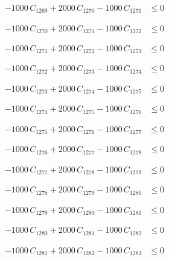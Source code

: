 \documentclass[a4paper,11pt]{article}
\begin{document}
\begin{align}
-1000\,C_{1269} + 2000\,C_{1270} - 1000\,C_{1271} &\leq 0 \nonumber
\end{align}

\begin{align}
-1000\,C_{1270} + 2000\,C_{1271} - 1000\,C_{1272} &\leq 0 \nonumber
\end{align}

\begin{align}
-1000\,C_{1271} + 2000\,C_{1272} - 1000\,C_{1273} &\leq 0 \nonumber
\end{align}

\begin{align}
-1000\,C_{1272} + 2000\,C_{1273} - 1000\,C_{1274} &\leq 0 \nonumber
\end{align}

\begin{align}
-1000\,C_{1273} + 2000\,C_{1274} - 1000\,C_{1275} &\leq 0 \nonumber
\end{align}

\begin{align}
-1000\,C_{1274} + 2000\,C_{1275} - 1000\,C_{1276} &\leq 0 \nonumber
\end{align}

\begin{align}
-1000\,C_{1275} + 2000\,C_{1276} - 1000\,C_{1277} &\leq 0 \nonumber
\end{align}

\begin{align}
-1000\,C_{1276} + 2000\,C_{1277} - 1000\,C_{1278} &\leq 0 \nonumber
\end{align}

\begin{align}
-1000\,C_{1277} + 2000\,C_{1278} - 1000\,C_{1279} &\leq 0 \nonumber
\end{align}

\begin{align}
-1000\,C_{1278} + 2000\,C_{1279} - 1000\,C_{1280} &\leq 0 \nonumber
\end{align}

\begin{align}
-1000\,C_{1279} + 2000\,C_{1280} - 1000\,C_{1281} &\leq 0 \nonumber
\end{align}

\begin{align}
-1000\,C_{1280} + 2000\,C_{1281} - 1000\,C_{1282} &\leq 0 \nonumber
\end{align}

\begin{align}
-1000\,C_{1281} + 2000\,C_{1282} - 1000\,C_{1283} &\leq 0 \nonumber
\end{align}
\end{document}
